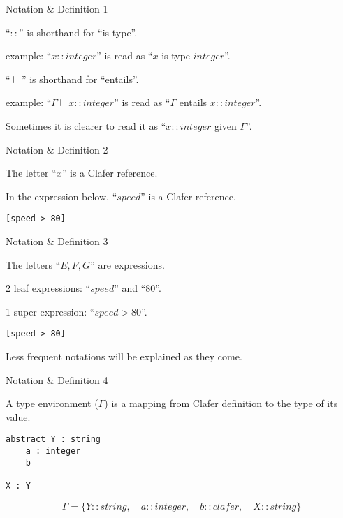 \documentclass[table,15pt,t]{beamer}
\begin{document}
\begin{frame}[fragile,c]{Notation \& Definition 1}
\begin{definition}
``$::$'' is shorthand for ``is type''.
\end{definition}
example: ``$x::integer$'' is read as ``$x$ is type $integer$''.

\begin{definition}
``$\vdash$'' is shorthand for ``entails''.
\end{definition}

example: ``$\Gamma\vdash x::integer$'' is read as ``$\Gamma$ entails $x::integer$''.

Sometimes it is clearer to read it as ``$x::integer$ given $\Gamma$''.
\end{frame}


\begin{frame}[fragile,c]{Notation \& Definition 2}
\begin{definition}
The letter ``$x$'' is a Clafer reference.
\end{definition}

In the expression below, ``$speed$'' is a Clafer reference.
\begin{lstlisting}
[speed > 80]
\end{lstlisting}
\end{frame}

\begin{frame}[fragile,c]{Notation \& Definition 3}

\begin{definition}
The letters ``$E,F,G$'' are expressions.
\end{definition}

2 leaf expressions: ``$speed$'' and ``$80$''.

1 super expression: ``$speed > 80$''.
\begin{lstlisting}
[speed > 80]
\end{lstlisting}

\vfill Less frequent notations will be explained as they come.
\end{frame}

\begin{frame}[fragile,c]{Notation \& Definition 4}

\begin{definition}
A type environment ($\Gamma$) is a mapping from Clafer definition to the type of its value.
\end{definition}

\vfill \begin{lstlisting}
abstract Y : string
    a : integer
    b

X : Y
\end{lstlisting}

\begin{equation*}
\Gamma = \{ Y::string,\quad a::integer,\quad b::clafer,\quad X::string \}
\end{equation*}
\end{frame}
\end{document}
